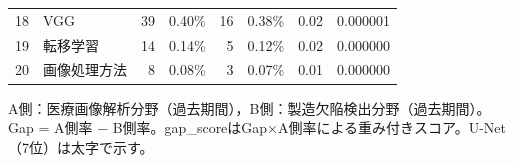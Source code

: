 \begin{table}[tbp]
{\begin{tabular}{rlrrrrrr}
18 & VGG                       &    39 &  0.40\% &    16 &  0.38\% &  0.02 & 0.000001 \\
19 & 転移学習                      &    14 &  0.14\% &     5 &  0.12\% &  0.02 & 0.000000 \\
20 & 画像処理方法                    &     8 &  0.08\% &     3 &  0.07\% &  0.01 & 0.000000 \\
\bottomrule
\end{tabular}
}
\begin{flushleft}
\footnotesize
A側：医療画像解析分野（過去期間），B側：製造欠陥検出分野（過去期間）。Gap = A側率 − B側率。gap\_scoreはGap×A側率による重み付きスコア。U-Net（7位）は太字で示す。
\end{flushleft}
\end{table}
